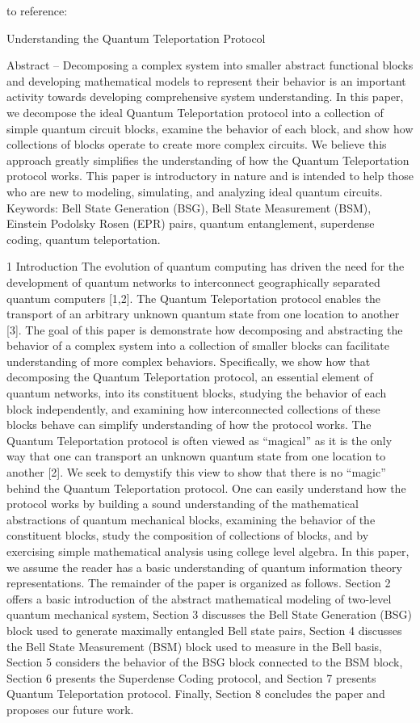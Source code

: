 to reference: \cite{sprangerUnderstandingQuantumTeleportation_2023}

Understanding the Quantum Teleportation Protocol

Abstract – Decomposing a complex system into smaller abstract functional blocks and developing mathematical models to represent their behavior is an important activity towards developing comprehensive system understanding. In this paper, we decompose the ideal Quantum Teleportation protocol into a collection of simple quantum circuit blocks, examine the behavior of each block, and show how collections of blocks operate to create more complex circuits. We believe this approach greatly simplifies the understanding of how the Quantum Teleportation protocol works. This paper is introductory in nature and is intended to help those who are new to modeling, simulating, and analyzing ideal quantum circuits. Keywords: Bell State Generation (BSG), Bell State Measurement (BSM), Einstein Podolsky Rosen (EPR) pairs, quantum entanglement, superdense coding, quantum teleportation.

1 Introduction The evolution of quantum computing has driven the need for the development of quantum networks to interconnect geographically separated quantum computers [1,2]. The Quantum Teleportation protocol enables the transport of an arbitrary unknown quantum state from one location to another [3]. The goal of this paper is demonstrate how decomposing and abstracting the behavior of a complex system into a collection of smaller blocks can facilitate understanding of more complex behaviors. Specifically, we show how that decomposing the Quantum Teleportation protocol, an essential element of quantum networks, into its constituent blocks, studying the behavior of each block independently, and examining how interconnected collections of these blocks behave can simplify understanding of how the protocol works. The Quantum Teleportation protocol is often viewed as “magical” as it is the only way that one can transport an unknown quantum state from one location to another [2]. We seek to demystify this view to show that there is no “magic” behind the Quantum Teleportation protocol. One can easily understand how the protocol works by building a sound understanding of the mathematical abstractions of quantum mechanical blocks, examining the behavior of the constituent blocks, study the composition of collections of blocks, and by exercising simple mathematical analysis using college level algebra. In this paper, we assume the reader has a basic understanding of quantum information theory representations. The remainder of the paper is organized as follows. Section 2 offers a basic introduction of the abstract mathematical modeling of two-level quantum mechanical system, Section 3 discusses the Bell State Generation (BSG) block used to generate maximally entangled Bell state pairs, Section 4 discusses the Bell State Measurement (BSM) block used to measure in the Bell basis, Section 5 considers the behavior of the BSG block connected to the BSM block, Section 6 presents the Superdense Coding protocol, and Section 7 presents Quantum Teleportation protocol. Finally, Section 8 concludes the paper and proposes our future work.



